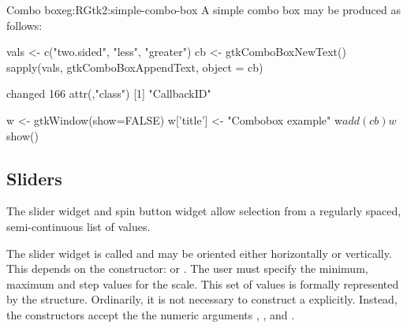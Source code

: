 \begin{example}{Combo box}{eg:RGtk2:simple-combo-box}
A simple combo box may be produced as follows:
\begin{Schunk}
\begin{Sinput}
 vals <- c("two.sided", "less", "greater")
 cb <- gtkComboBoxNewText()
 sapply(vals, gtkComboBoxAppendText, object = cb)
\end{Sinput}
\begin{Soutput}
changed 
    166 
attr(,"class")
[1] "CallbackID"
\end{Soutput}
\begin{Sinput}
 w <- gtkWindow(show=FALSE)
 w['title'] <- "Combobox example"
 w$add(cb)
 w$show()
\end{Sinput}
\end{Schunk}
\end{example}

\subsection{Sliders}
\label{sec:RGtk2:sliders}

The slider widget and spin button widget allow selection from a
regularly spaced, semi-continuous list of values.

The slider widget is called  and may be oriented
either horizontally or vertically. This depends on the constructor:
 or .  The user must
specify the minimum, maximum and step values for the scale.  This set
of values is formally represented by the 
structure. Ordinarily, it is not necessary to construct a
 explicitly. Instead, the constructors accept the
the numeric arguments , ,
and .

